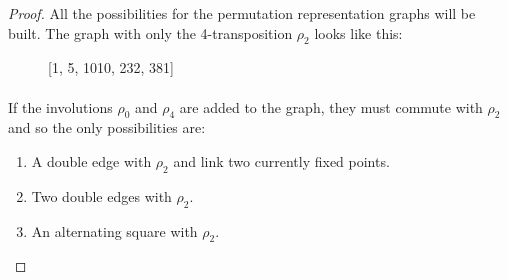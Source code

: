 \begin{proof}
  All the possibilities for the permutation representation graphs will be built. The graph with only the 4-transposition $\rho_2$ looks like this:

  \begin{figure}[H]
    \begin{center}
      \caption{[1, 5, 1010, 232, 381]}
    \end{center}
  \end{figure}

\paragraph{}
If the involutions $\rho_0$ and $\rho_4$ are added to the graph, they must commute with $\rho_2$ and so the only possibilities are:
\begin{enumerate}
  \item A double edge with $\rho_2$ and link two currently fixed points.
  \item Two double edges with $\rho_2$.
  \item An alternating square with $\rho_2$.
\end{enumerate}


\end{proof}
